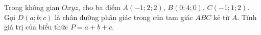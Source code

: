 \begin{ex}
Trong không gian $Oxyz$, cho ba điểm $A(-1;2;2)$, $B(0;4;0)$, $C(-1;1;2)$. Gọi $D(a;b;c)$ là chân đường phân giác trong của tam giác $ABC$ kẻ từ $A$. Tính giá trị của biểu thức $P=a+b+c$.
\end{ex}

